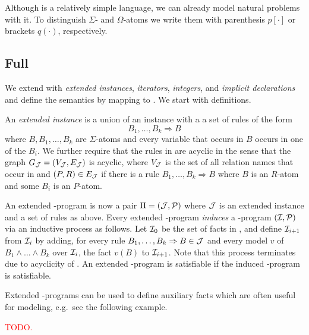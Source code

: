 \documentclass[conference]{IEEEtran}
\begin{document}
{\color{red} Although \bcore is a relatively simple language, we can
already model natural problems with it. To distinguish $\Sigma$- and
$\Omega$-atoms we write them with parenthesis $p[\cdot]$ or brackets
$q(\cdot)$,
respectively.



\begin{example}
  
\end{example}

}


\subsection{Full \bule}

We extend \bcore with \emph{extended instances}, \emph{iterators},
\emph{integers}, and \emph{implicit declarations} and define the
semantics by mapping to \bcore. We start with definitions. 

An \emph{extended instance \Jmc} is a union of an instance \Imc with a
a set of rules of the form
%
\[B_1,\ldots,B_k\Rightarrow B\]
%
where $B,B_1,\ldots,B_k$ are $\Sigma$-atoms and every variable that
occurs in $B$ occurs in one of the $B_i$. We further require that the
rules in \Jmc are acyclic in the sense that the graph $G_\mathcal{J} = (V_\mathcal{J},E_\mathcal{J})$ is
acyclic, where $V_\mathcal{J}$ is the set of all relation names that occur in
\Jmc and $(P,R)\in E_\mathcal{J}$ if there is a rule
$B_1,\ldots,B_k\Rightarrow B$ where $B$ is an $R$-atom and some $B_i$
is an $P$-atom.  

An extended \bcore-program is now a pair $\Pi=(\mathcal{J},\mathcal{P})$ where
$\mathcal{J}$ is an extended instance and \Pmc a set of rules as above. Every
extended \bcore-program \emph{induces} a \bcore-program $(\mathcal{I},\mathcal{P})$
via an inductive process as follows. Let $\mathcal{I}_0$ be the set of facts
in \Jmc, and define $\mathcal{I}_{i+1}$ from $\mathcal{I}_i$ by adding, for every
rule $B_1,\ldots,B_k\Rightarrow B\in \mathcal{J}$ and every model $v$ of
$B_1\wedge \ldots \wedge B_k$ over $\mathcal{I}_i$, the fact $v(B)$ to
$\mathcal{I}_{i+1}$. Note that this process terminates due to acyclicity of
\Jmc. An extended \bcore-program is satisfiable if the induced
\bcore-program is satisfiable. 

Extended \bcore-programs can be used to define auxiliary facts which
are often useful for modeling, e.g.~see the following example. 
%
\begin{example}
  \textcolor{red}{TODO.}
\end{example}
\end{document}
